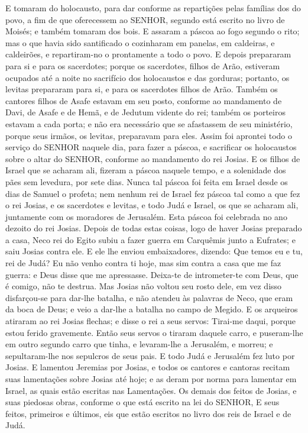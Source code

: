 {E tomaram do holocausto, para dar conforme as repartições pelas famílias dos do povo, a fim de que oferecessem ao SENHOR, segundo está escrito no livro de Moisés; e também tomaram dos bois.
E assaram a páscoa ao fogo segundo o rito; mas o que havia sido santificado o cozinharam em panelas, em caldeiras, e caldeirões, e repartiram-no o prontamente a todo o povo.
E depois prepararam para si e para os sacerdotes; porque os sacerdotes, filhos de Arão, estiveram ocupados até a noite no sacrifício dos holocaustos e das gorduras; portanto, os levitas prepararam para si, e para os sacerdotes filhos de Arão.
Também os cantores filhos de Asafe estavam em seu posto, conforme ao mandamento de Davi, de Asafe e de Hemã, e de Jedutum vidente do rei; também os porteiros estavam a cada porta; e não era necessário que se afastassem de seu ministério, porque seus irmãos, os levitas, preparavam para eles.
Assim foi aprontei todo o serviço do SENHOR naquele dia, para fazer a páscoa, e sacrificar os holocaustos sobre o altar do SENHOR, conforme ao mandamento do rei Josias.
E os filhos de Israel que se acharam ali, fizeram a páscoa naquele tempo, e a solenidade dos pães sem levedura, por sete dias.
Nunca tal páscoa foi feita em Israel desde os dias de Samuel o profeta; nem nenhum rei de Israel fez páscoa tal como a que fez o rei Josias, e os sacerdotes e levitas, e todo Judá e Israel, os que se acharam ali, juntamente com os moradores de Jerusalém.
Esta páscoa foi celebrada no ano dezoito do rei Josias.
Depois de todas estas coisas, logo de haver Josias preparado a casa, Neco rei do Egito subiu a fazer guerra em Carquêmis junto a Eufrates; e saiu Josias contra ele.
E ele lhe enviou embaixadores, dizendo: Que temos eu e tu, rei de Judá? Eu não venho contra ti hoje, mas sim contra a casa que me faz guerra: e Deus disse que me apressasse. Deixa-te de intrometer-te com Deus, que é comigo, não te destrua.
Mas Josias não voltou seu rosto dele, em vez disso disfarçou-se para dar-lhe batalha, e não atendeu às palavras de Neco, que eram da boca de Deus; e veio a dar-lhe a batalha no campo de Megido.
E os arqueiros atiraram ao rei Josias flechas; e disse o rei a seus servos: Tirai-me daqui, porque estou ferido gravemente.
Então seus servos o tiraram daquele carro, e puseram-lhe em outro segundo carro que tinha, e levaram-lhe a Jerusalém, e morreu; e sepultaram-lhe nos sepulcros de seus pais. E todo Judá e Jerusalém fez luto por Josias.
E lamentou Jeremias por Josias, e todos os cantores e cantoras recitam suas lamentações sobre Josias até hoje; e as deram por norma para lamentar em Israel, as quais estão escritas nas Lamentações.
Os demais dos feitos de Josias, e suas piedosas obras, conforme o que está escrito na lei do SENHOR,
E seus feitos, primeiros e últimos, eis que estão escritos no livro dos reis de Israel e de Judá.

}
